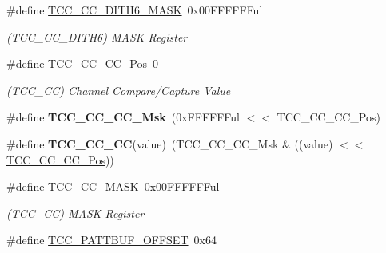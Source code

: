 \begin{DoxyCompactItemize}
\item 
\hypertarget{group___s_a_m_l21___t_c_c_ga3d9901282873c941200b2d0d5165c2cc}{}\#define \hyperlink{group___s_a_m_l21___t_c_c_ga3d9901282873c941200b2d0d5165c2cc}{T\+C\+C\+\_\+\+C\+C\+\_\+\+D\+I\+T\+H6\+\_\+\+M\+A\+S\+K}~0x00\+F\+F\+F\+F\+F\+Ful\label{group___s_a_m_l21___t_c_c_ga3d9901282873c941200b2d0d5165c2cc}

\begin{DoxyCompactList}\small\item\em (T\+C\+C\+\_\+\+C\+C\+\_\+\+D\+I\+T\+H6) M\+A\+S\+K Register \end{DoxyCompactList}\item 
\hypertarget{group___s_a_m_l21___t_c_c_gad4ec6f8440a3eb318e482bb2e8749ddb}{}\#define \hyperlink{group___s_a_m_l21___t_c_c_gad4ec6f8440a3eb318e482bb2e8749ddb}{T\+C\+C\+\_\+\+C\+C\+\_\+\+C\+C\+\_\+\+Pos}~0\label{group___s_a_m_l21___t_c_c_gad4ec6f8440a3eb318e482bb2e8749ddb}

\begin{DoxyCompactList}\small\item\em (T\+C\+C\+\_\+\+C\+C) Channel Compare/\+Capture Value \end{DoxyCompactList}\item 
\hypertarget{group___s_a_m_l21___t_c_c_ga4848f2abd9f232dee1c917a158612c25}{}\#define {\bfseries T\+C\+C\+\_\+\+C\+C\+\_\+\+C\+C\+\_\+\+Msk}~(0x\+F\+F\+F\+F\+F\+Ful $<$$<$ T\+C\+C\+\_\+\+C\+C\+\_\+\+C\+C\+\_\+\+Pos)\label{group___s_a_m_l21___t_c_c_ga4848f2abd9f232dee1c917a158612c25}

\item 
\hypertarget{group___s_a_m_l21___t_c_c_ga46f505296cf8e8e5e2238f111e6b0a34}{}\#define {\bfseries T\+C\+C\+\_\+\+C\+C\+\_\+\+C\+C}(value)~(T\+C\+C\+\_\+\+C\+C\+\_\+\+C\+C\+\_\+\+Msk \& ((value) $<$$<$ \hyperlink{group___s_a_m_l21___t_c_c_gad4ec6f8440a3eb318e482bb2e8749ddb}{T\+C\+C\+\_\+\+C\+C\+\_\+\+C\+C\+\_\+\+Pos}))\label{group___s_a_m_l21___t_c_c_ga46f505296cf8e8e5e2238f111e6b0a34}

\item 
\hypertarget{group___s_a_m_l21___t_c_c_ga510dcc62bbde1a39d1b86297846d7ba5}{}\#define \hyperlink{group___s_a_m_l21___t_c_c_ga510dcc62bbde1a39d1b86297846d7ba5}{T\+C\+C\+\_\+\+C\+C\+\_\+\+M\+A\+S\+K}~0x00\+F\+F\+F\+F\+F\+Ful\label{group___s_a_m_l21___t_c_c_ga510dcc62bbde1a39d1b86297846d7ba5}

\begin{DoxyCompactList}\small\item\em (T\+C\+C\+\_\+\+C\+C) M\+A\+S\+K Register \end{DoxyCompactList}\item 
\hypertarget{group___s_a_m_l21___t_c_c_ga291061387bacaf8a1e8b48fdd1f91e68}{}\#define \hyperlink{group___s_a_m_l21___t_c_c_ga291061387bacaf8a1e8b48fdd1f91e68}{T\+C\+C\+\_\+\+P\+A\+T\+T\+B\+U\+F\+\_\+\+O\+F\+F\+S\+E\+T}~0x64\label{group___s_a_m_l21___t_c_c_ga291061387bacaf8a1e8b48fdd1f91e68}


\end{DoxyCompactItemize}
